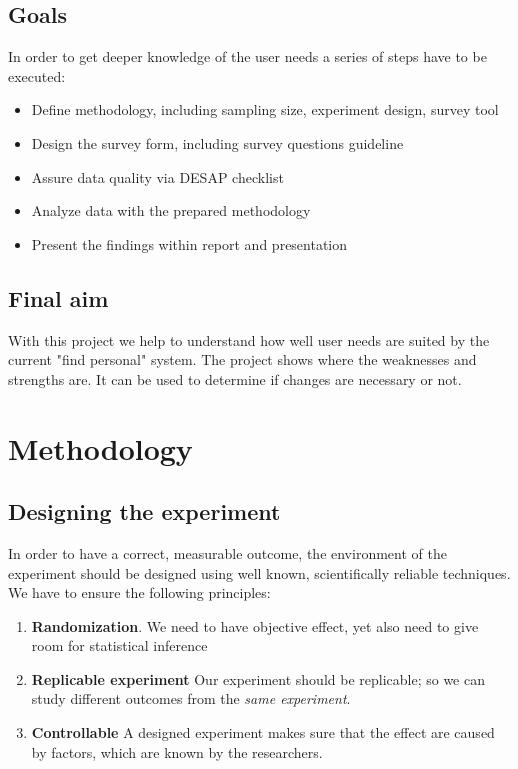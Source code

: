 \documentclass[12pt,a4paper,paper=a4,oneside,titlepage,pdftex]{scrartcl}
\begin{document}
\subsection{Goals}
In order to get deeper knowledge of the user needs a series of steps have to be executed:
\begin{itemize}
	\item Define methodology, including sampling size, experiment design, survey tool
	\item Design the survey form, including survey questions guideline
	\item Assure data quality via DESAP checklist
	\item Analyze data with the prepared methodology
	\item Present the findings within report and presentation
\end{itemize}

\subsection{Final aim}
With this project we help to understand how well user needs are suited by the current "find personal" system. The project shows where the weaknesses and strengths are. It can be used to determine if changes are necessary or not.

\section{Methodology}

\subsection{Designing the experiment}
In order to have a correct, measurable outcome, the environment of the experiment should be designed using well known, scientifically reliable techniques. We have to ensure the following principles:
\begin{enumerate}
\item \textbf{Randomization}.  We need to have objective effect, yet also need to give room for statistical inference
\item\textbf{Replicable experiment} Our experiment should be replicable; so we can study different outcomes from the \textit{same experiment}.
\item \textbf{Controllable} A designed experiment makes sure that the effect are caused by factors, which are known by the researchers.
\end{enumerate}
\end{document}

